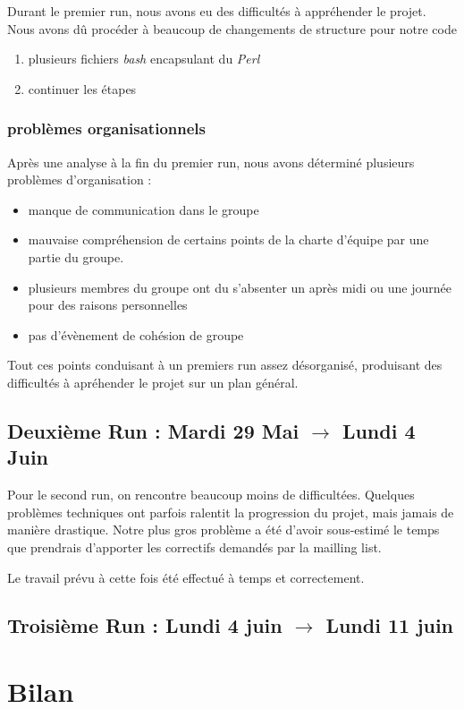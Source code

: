 \documentclass[11pt]{article}
\begin{document}
Durant le premier run, nous avons eu des difficultés à appréhender le projet. Nous avons dû procéder à beaucoup de changements de structure pour notre code
\begin{enumerate}
\item plusieurs fichiers \textit{bash} encapsulant du \textit{Perl}
\item continuer les étapes
\end{enumerate}

\subsubsection{problèmes organisationnels}

Après une analyse à la fin du premier run, nous avons déterminé plusieurs problèmes d'organisation : 

\begin{itemize}
\item manque de communication dans le groupe
\item mauvaise compréhension de certains points de la charte d'équipe par une partie du groupe.
\item plusieurs membres du groupe ont du s'absenter un après midi ou une journée pour des raisons personnelles
\item pas d'évènement de cohésion de groupe
\end{itemize}

Tout ces points conduisant à un premiers run assez désorganisé, produisant des difficultés à apréhender le projet sur un plan général.

\subsection{Deuxième Run : Mardi 29 Mai $\rightarrow$ Lundi 4 Juin}

Pour le second run, on rencontre beaucoup moins de difficultées. Quelques problèmes techniques ont parfois ralentit la progression du projet, mais jamais de manière drastique. Notre plus gros problème a été d'avoir sous-estimé le temps que prendrais d'apporter les correctifs demandés par la mailling list. 

Le travail prévu à cette fois été effectué à temps et correctement.

\subsection{Troisième Run : Lundi 4 juin $\rightarrow$ Lundi 11 juin}

\section{Bilan}
\end{document}
